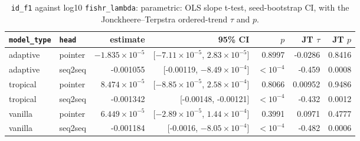 \documentclass[10pt]{article}
\begin{document}
{\small
\begin{longtable}{llrrrrr}
\caption{\texttt{id\_f1} against log10 \texttt{fishr\_lambda}: parametric: OLS slope t-test, seed-bootstrap CI, with the Jonckheere--Terpstra ordered-trend $\tau$ and $p$.}\label{tab:trend-id_f1}\\
\toprule
\texttt{model\_type} & \texttt{head} & estimate & 95\% CI & $p$ & JT $\tau$ & JT $p$\\
\midrule
\endhead
adaptive & pointer & $-1.835\times10^{-5}$ & [$-7.11\times10^{-5}$, $2.83\times10^{-5}$] & 0.8997 & -0.0286 & 0.8416\\
adaptive & seq2seq & -0.001055 & [-0.00119, $-8.49\times10^{-4}$] & $<10^{-4}$ & -0.459 & 0.0008\\
tropical & pointer & $8.474\times10^{-5}$ & [$-8.85\times10^{-5}$, $2.58\times10^{-4}$] & 0.8066 & 0.00952 & 0.9486\\
tropical & seq2seq & -0.001342 & [-0.00148, -0.00121] & $<10^{-4}$ & -0.432 & 0.0012\\
vanilla & pointer & $6.449\times10^{-5}$ & [$-2.89\times10^{-5}$, $1.44\times10^{-4}$] & 0.3991 & 0.0971 & 0.4777\\
vanilla & seq2seq & -0.001184 & [-0.0016, $-8.05\times10^{-4}$] & $<10^{-4}$ & -0.482 & 0.0006\\
\bottomrule
\end{longtable}
}
\end{document}
